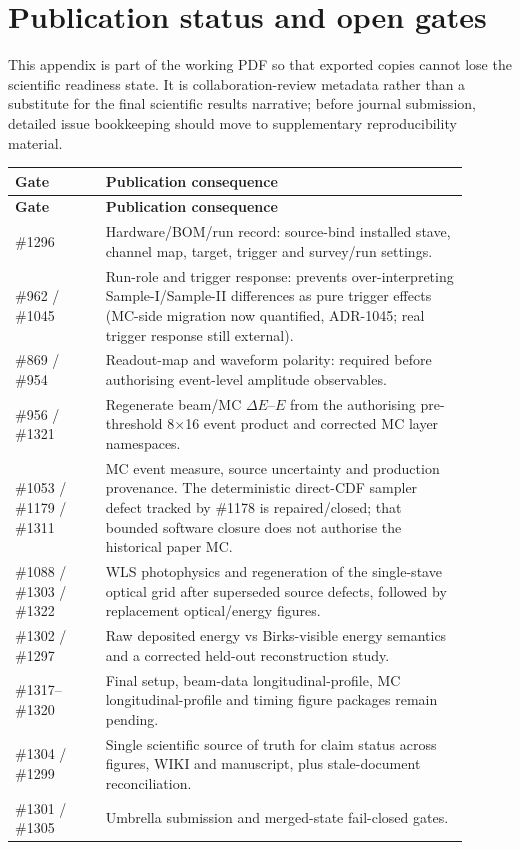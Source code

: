 \section{Publication status and open gates}

This appendix is part of the working PDF so that exported copies cannot lose the scientific readiness state. It is collaboration-review metadata rather than a substitute for the final scientific results narrative; before journal submission, detailed issue bookkeeping should move to supplementary reproducibility material.

\begin{longtable}{p{0.18\linewidth}p{0.72\linewidth}}
\toprule
\textbf{Gate} & \textbf{Publication consequence}\\
\midrule
\endfirsthead
\toprule
\textbf{Gate} & \textbf{Publication consequence}\\
\midrule
\endhead
\#1296 & Hardware/BOM/run record: source-bind installed stave, channel map, target, trigger and survey/run settings.\\
\#962 / \#1045 & Run-role and trigger response: prevents over-interpreting Sample-I/Sample-II differences as pure trigger effects (MC-side migration now quantified, ADR-1045; real trigger response still external).\\
\#869 / \#954 & Readout-map and waveform polarity: required before authorising event-level amplitude observables.\\
\#956 / \#1321 & Regenerate beam/MC \(\Delta E\)--\(E\) from the authorising pre-threshold 8\(\times\)16 event product and corrected MC layer namespaces.\\
\#1053 / \#1179 / \#1311 & MC event measure, source uncertainty and production provenance. The deterministic direct-CDF sampler defect tracked by \#1178 is repaired/closed; that bounded software closure does not authorise the historical paper MC.\\
\#1088 / \#1303 / \#1322 & WLS photophysics and regeneration of the single-stave optical grid after superseded source defects, followed by replacement optical/energy figures.\\
\#1302 / \#1297 & Raw deposited energy vs Birks-visible energy semantics and a corrected held-out reconstruction study.\\
\#1317--\#1320 & Final setup, beam-data longitudinal-profile, MC longitudinal-profile and timing figure packages remain pending.\\
\#1304 / \#1299 & Single scientific source of truth for claim status across figures, WIKI and manuscript, plus stale-document reconciliation.\\
\#1301 / \#1305 & Umbrella submission and merged-state fail-closed gates.\\
\bottomrule
\end{longtable}

